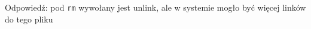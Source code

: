 Odpowiedź: pod \texttt{rm} wywołany jest unlink, ale w systemie mogło być więcej linków do tego pliku
